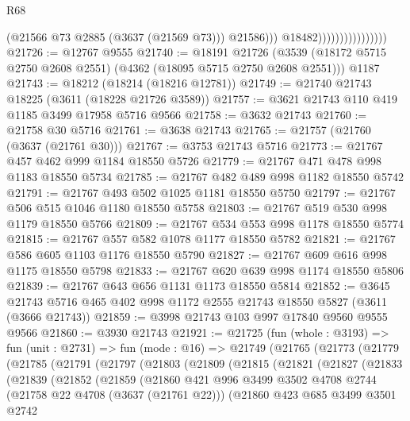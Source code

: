 \begin{lexlean}{R68}
\begin{coremodule}
                                          (@21566 @73 @2885 (@3637 (@21569 @73)))
                                          @21586)))
                                    @18482))))))))))))))))
@21726 := @12767 @9555
@21740 := @18191
    @21726
    (@3539 (@18172 @5715 @2750 @2608 @2551) (@4362 (@18095 @5715 @2750 @2608 @2551)))
    @1187
@21743 := @18212 (@18214 (@18216 @12781))
@21749 := @21740 @21743 @18225 (@3611 (@18228 @21726 @3589))
@21757 := @3621 @21743 @110 @419 @1185 @3499 @17958 @5716 @9566
@21758 := @3632 @21743
@21760 := @21758 @30 @5716
@21761 := @3638 @21743
@21765 := @21757 (@21760 (@3637 (@21761 @30)))
@21767 := @3753 @21743 @5716
@21773 := @21767 @457 @462 @999 @1184 @18550 @5726
@21779 := @21767 @471 @478 @998 @1183 @18550 @5734
@21785 := @21767 @482 @489 @998 @1182 @18550 @5742
@21791 := @21767 @493 @502 @1025 @1181 @18550 @5750
@21797 := @21767 @506 @515 @1046 @1180 @18550 @5758
@21803 := @21767 @519 @530 @998 @1179 @18550 @5766
@21809 := @21767 @534 @553 @998 @1178 @18550 @5774
@21815 := @21767 @557 @582 @1078 @1177 @18550 @5782
@21821 := @21767 @586 @605 @1103 @1176 @18550 @5790
@21827 := @21767 @609 @616 @998 @1175 @18550 @5798
@21833 := @21767 @620 @639 @998 @1174 @18550 @5806
@21839 := @21767 @643 @656 @1131 @1173 @18550 @5814
@21852 := @3645 @21743 @5716 @465 @402 @998 @1172 @2555 @21743 @18550 @5827 (@3611 (@3666 @21743))
@21859 := @3998 @21743 @103 @997 @17840 @9560 @9555 @9566
@21860 := @3930 @21743
@21921 := @21725
    (fun (whole : @3193) =>
    fun (unit : @2731) =>
    fun (mode : @16) =>
    @21749
      (@21765
        (@21773
          (@21779
            (@21785
              (@21791
                (@21797
                  (@21803
                    (@21809
                      (@21815
                        (@21821
                          (@21827
                            (@21833
                              (@21839
                                (@21852
                                  (@21859
                                    (@21860
                                      @421
                                      @996
                                      @3499
                                      @3502
                                      @4708
                                      @2744
                                      (@21758 @22 @4708 (@3637 (@21761 @22)))
                                      (@21860
                                        @423
                                        @685
                                        @3499
                                        @3501
                                        @2742

\end{coremodule}
\end{lexlean}
